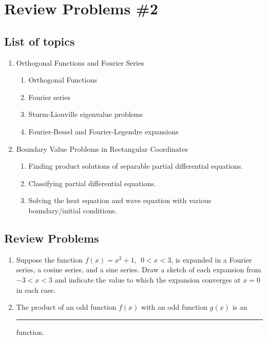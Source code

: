 \chapter{Review Problems \#2}
\label{ch:rev2}
\begin{fullwidth}
\section{List of topics}
\begin{enumerate}
\item Orthogonal Functions and Fourier Series
\begin{enumerate}
\item Orthogonal Functions
\item Fourier series
\item Sturm-Liouville eigenvalue problems
\item Fourier-Bessel and Fourier-Legendre expansions
\end{enumerate}

\item Boundary Value Problems in Rectangular Coordinates
\begin{enumerate}
\item Finding product solutions of separable partial differential equations.
\item Classifying partial differential equations.
\item Solving the heat equation and wave equation with various boundary/initial conditions.
\end{enumerate}

\end{enumerate}

\section{Review Problems}

\begin{enumerate}
\item Suppose the function $f(x)=x^2+1, \ \ 0<x<3$, is expanded in a Fourier series, a cosine series, and a sine series.  Draw a sketch of each expansion from $-3<x<3$ and indicate the value to which the expansion converges at $x=0$ in each case.


\vspace{1.0cm}

\item The product of an odd function $f(x)$ with an odd function $g(x)$ is an \rule{2cm}{0.15mm} function.



\end{enumerate}
\end{fullwidth}

